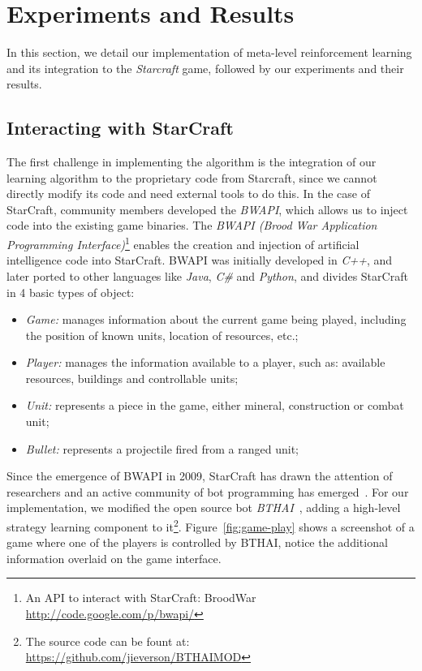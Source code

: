 \chapter{Experiments and Results}
\label{chapter:results}

In this section, we detail our implementation of meta-level reinforcement learning and its integration to the \emph{Starcraft} game, followed by our experiments and their results. 



\section{Interacting with StarCraft}
\label{sec:bwapi}

The first challenge in implementing the algorithm is the integration of our learning algorithm to the proprietary code from Starcraft, since we cannot directly modify its code and need external tools to do this. 
In the case of StarCraft, community members developed the \textit{BWAPI}, which allows us to inject code into the existing game binaries. 
The \textit{BWAPI (Brood War Application Programming Interface)}\footnote{An API to interact with StarCraft: BroodWar \url{http://code.google.com/p/bwapi/}} enables the creation and injection of artificial intelligence code into StarCraft. 
BWAPI was initially developed in \textit{C++}, and later ported to other languages like \textit{Java}, \textit{C\#} and \textit{Python}, and divides StarCraft in 4 basic types of object:


\begin{itemize}
\item \textit{Game:} manages information about the current game being played, 
including the position of known units, location of resources, etc.;
\item \textit{Player:} manages the information available to a player, such as: 
available resources, buildings and controllable units;
\item \textit{Unit:} represents a piece in the game, either mineral, construction or combat unit;
\item \textit{Bullet:} represents a projectile fired from a ranged unit;
\end{itemize}

Since the emergence of BWAPI in 2009, StarCraft has drawn the attention of researchers and an active community of bot programming has emerged~\cite{buro2012real}. 
For our implementation, we modified the open source bot \textit{BTHAI}~\cite{hagelback2012potential},
adding a high-level strategy learning component to it\footnote{The source code can be fount at: \url{https://github.com/jieverson/BTHAIMOD}}.
Figure~\ref{fig:game-play} shows a screenshot of a game where one of the players is controlled by BTHAI, notice the additional information overlaid on the game interface. 

